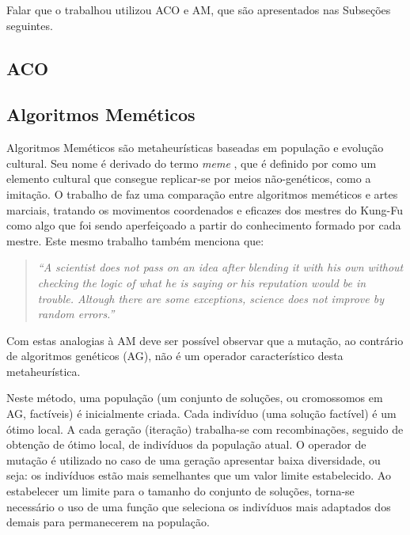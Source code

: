 Falar que o trabalhou utilizou ACO e AM, que são apresentados nas
Subseções seguintes.

\subsection{ACO}

\subsection{Algoritmos Meméticos}

Algoritmos Meméticos \cite{moscato1} são metaheurísticas baseadas
em população e evolução cultural.
Seu nome é derivado do termo \textit{meme} \cite{dawkins}, que é
definido por \cite{oxford-dict} como um elemento cultural que consegue
replicar-se por meios não-genéticos, como a imitação.
O trabalho de \cite{moscato1} faz uma comparação entre algoritmos
meméticos e artes marciais, tratando os movimentos coordenados e
eficazes dos mestres do Kung-Fu como algo que foi sendo aperfeiçoado
a partir do conhecimento formado por cada mestre. Este mesmo trabalho
também menciona que:
\begin{quote}
\textit{``A scientist does not pass on an idea after blending it with
  his own without checking the logic of what he is saying or his
  reputation would be in trouble. Altough there are some
  exceptions, science does not improve by random errors.''}
\end{quote}
Com estas analogias à AM deve ser possível observar que a mutação, ao
contrário de algoritmos genéticos (AG), não é um operador
característico desta metaheurística.

Neste método, uma população (um conjunto de soluções, ou cromossomos
em AG, factíveis) é
inicialmente criada. Cada indivíduo (uma solução factível) é um ótimo
local. A cada geração (iteração) trabalha-se com recombinações,
seguido de obtenção de ótimo local, de indivíduos da população
atual. O operador de mutação é utilizado no caso de uma
geração apresentar baixa diversidade, ou seja: os indivíduos estão
mais semelhantes que um valor limite estabelecido.
Ao estabelecer um limite para o tamanho do conjunto de soluções,
torna-se necessário o uso de uma função que seleciona os indivíduos
mais adaptados dos demais para permanecerem na população.


